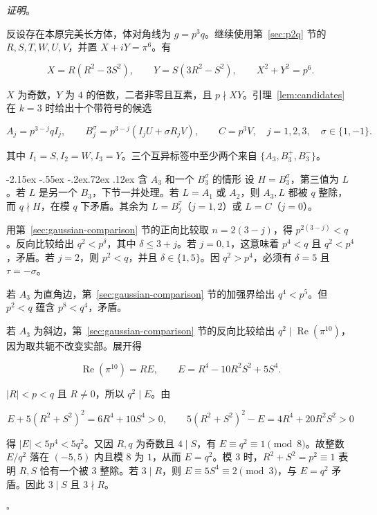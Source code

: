 \documentclass[11pt,a4paper,twoside]{article}
\makeatletter
\numberwithin{equation}{section}
\newcommand{\proseheadingstop}{。}
\providecommand{\proofname}{证明}
\renewcommand{\subsection}{\@startsection{subsection}{2}{\z@}%
  {-2.15ex \@plus -.55ex \@minus -.2ex}{.72ex \@plus .12ex}%
  {\normalfont\normalsize\bfseries}}
\newenvironment{proof}[1][\proofname]{%
  \par\addvspace{.65\baselineskip}\noindent
  \textit{#1}\proseheadingstop\enspace\ignorespaces
}{%
  \unskip\nobreak\hfill\nobreak\(\square\)\par
  \addvspace{.65\baselineskip}
}
\makeatother
\begin{document}
\begin{proof}
反设存在本原完美长方体，体对角线为 \(g=p^3q\)。继续使用第~\ref{sec:p2q} 节的 \(R,S,T,W,U,V\)，并置 \(X+iY=\pi^6\)。有

\[
X=R(R^2-3S^2),\qquad Y=S(3R^2-S^2),\qquad X^2+Y^2=p^6.
\]

\(X\) 为奇数，\(Y\) 为 \(4\) 的倍数，二者非零且互素，且 \(p\nmid XY\)。引理~\ref{lem:candidates} 在 \(k=3\) 时给出十个带符号的候选

\[
A_j=p^{3-j}qI_j,\qquad B_j^\sigma=p^{3-j}(I_jU+\sigma R_jV),\qquad C=p^3V,
\quad j=1,2,3,\quad \sigma\in\{1,-1\}.
\]

其中 \(I_1=S,I_2=W,I_3=Y\)。三个互异标签中至少两个来自 \(\{A_3,B_3^+,B_3^-\}\)。

\subsection{含 \texorpdfstring{\(A_3\)}{A₃} 和一个 \texorpdfstring{\(B_3^\sigma\)}{B₃(σ)} 的情形}
设 \(H=B_3^\sigma\)，第三值为 \(L\)。若 \(L\) 是另一个 \(B_3\)，下节一并处理。若 \(L=A_1\) 或 \(A_2\)，则 \(A_3,L\) 都被 \(q\) 整除，而 \(q\nmid H\)，在模 \(q\) 下矛盾。其余为 \(L=B_j^\tau\)（\(j=1,2\)）或 \(L=C\)（\(j=0\)）。

用第~\ref{sec:gaussian-comparison} 节的正向比较取 \(n=2(3-j)\)，得 \(p^{2(3-j)}<q\)。反向比较给出 \(q^2<p^\delta\)，其中 \(\delta\le3+j\)。若 \(j=0,1\)，这意味着 \(p^4<q\) 且 \(q^2<p^4\)，矛盾。若 \(j=2\)，则 \(p^2<q\)，并且 \(\delta\in\{1,5\}\)。因 \(q^2>p^4\)，必须有 \(\delta=5\) 且 \(\tau=-\sigma\)。

若 \(A_3\) 为直角边，第~\ref{sec:gaussian-comparison} 节的加强界给出 \(q^4<p^5\)。但 \(p^2<q\) 蕴含 \(p^8<q^4\)，矛盾。

若 \(A_3\) 为斜边，第~\ref{sec:gaussian-comparison} 节的反向比较给出 \(q^2\mid\operatorname{Re}(\pi^{10})\)，因为取共轭不改变实部。展开得

\[
\operatorname{Re}(\pi^{10})=R E,\qquad E=R^4-10R^2S^2+5S^4.
\]

\(|R|<p<q\) 且 \(R\ne0\)，所以 \(q^2\mid E\)。由

\[
E+5(R^2+S^2)^2=6R^4+10S^4>0,\qquad
5(R^2+S^2)^2-E=4R^4+20R^2S^2>0
\]

得 \(|E|<5p^4<5q^2\)。又因 \(R,q\) 为奇数且 \(4\mid S\)，有 \(E\equiv q^2\equiv1\pmod8\)。故整数 \(E/q^2\) 落在 \((-5,5)\) 内且模 \(8\) 为 \(1\)，从而 \(E=q^2\)。模 \(3\) 时，\(R^2+S^2=p^2\equiv1\) 表明 \(R,S\) 恰有一个被 \(3\) 整除。若 \(3\mid R\)，则 \(E\equiv5S^4\equiv2\pmod3\)，与 \(E=q^2\) 矛盾。因此 \(3\mid S\) 且 \(3\nmid R\)。


\end{proof}
\end{document}
